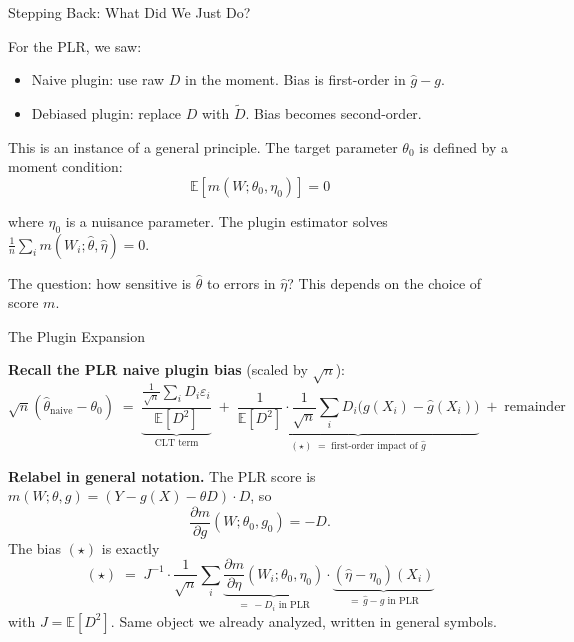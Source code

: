 \documentclass[aspectratio=169, 11pt, handout]{beamer}
\newcommand{\E}{\mathbb{E}}
\begin{document}
\begin{frame}{Stepping Back: What Did We Just Do?}

For the PLR, we saw:
\begin{itemize}
    \item Naive plugin: use raw $D$ in the moment. Bias is first-order in $\hat{g} - g$.
    \item Debiased plugin: replace $D$ with $\tilde{D}$. Bias becomes second-order.
\end{itemize}

\bigskip
\pause

This is an instance of a general principle. The target parameter $\theta_0$ is defined by a moment condition:
\[
\E[m(W; \theta_0, \eta_0)] = 0
\]

where $\eta_0$ is a nuisance parameter. The plugin estimator solves $\frac{1}{n}\sum_i m(W_i; \hat{\theta}, \hat{\eta}) = 0$.

\bigskip
\pause

The question: how sensitive is $\hat{\theta}$ to errors in $\hat{\eta}$? This depends on the choice of score $m$.

\end{frame}

\begin{frame}{The Plugin Expansion}

\textbf{Recall the PLR naive plugin bias} (scaled by $\sqrt n$):
\[
\sqrt{n}(\hat\theta_{\text{naive}} - \theta_0) \;=\; \underbrace{\frac{\frac{1}{\sqrt n}\sum_i D_i \varepsilon_i}{\E[D^2]}}_{\text{CLT term}} \;+\; \underbrace{\frac{1}{\E[D^2]} \cdot \frac{1}{\sqrt n}\sum_i D_i\bigl(g(X_i) - \hat g(X_i)\bigr)}_{(\star)\;=\;\text{first-order impact of }\hat g} \;+\; \text{remainder}
\]

\pause
\bigskip

\textbf{Relabel in general notation.} The PLR score is $m(W;\theta,g) = (Y - g(X) - \theta D)\cdot D$, so
\[
\frac{\partial m}{\partial g}(W; \theta_0, g_0) = -D.
\]
The bias $(\star)$ is exactly
\[
(\star) \;=\; J^{-1} \cdot \frac{1}{\sqrt n}\sum_i \underbrace{\frac{\partial m}{\partial \eta}(W_i; \theta_0, \eta_0)}_{=\,-D_i\text{ in PLR}} \cdot \underbrace{(\hat\eta - \eta_0)(X_i)}_{=\,\hat g - g\text{ in PLR}}
\]
with $J = \E[D^2]$. Same object we already analyzed, written in general symbols.

\end{frame}
\end{document}
